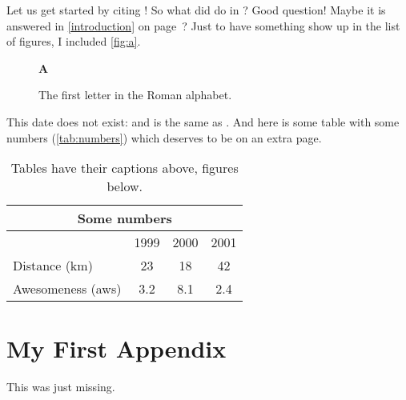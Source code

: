 \documentclass[german,bachelor]{swsLeipzig}
\begin{document}
Let us get started by citing \citet{manning:1999}!
So what did \citeauthor{manning:1999} do in \citeyear{manning:1999}?
Good question!
Maybe it is answered in \autoref{introduction} on page~\pageref{introduction}?
Just to have something show up in the list of figures, I included \autoref{fig:a}.
\begin{figure}[bt]%
  \begin{center}{\huge\bf A}\end{center}
  \caption{The first letter in the Roman alphabet.}\label{fig:a}
\end{figure}
This date does not exist: 
and is the same as .
And here is some table with some numbers (\autoref{tab:numbers})
which deserves to be on an extra page.
\begin{table}[p]%
  \caption{Tables have their captions above, figures below.}
  \begin{center}
    \begin{tabular}{lccc}\toprule
      \multicolumn{4}{c}{Some numbers}\\\midrule
      & 1999 & 2000 & 2001 \\\cmidrule(l){2-4}
      Distance (km) & 23 & 18 & 42 \\
      Awesomeness (aws) & 3.2 & 8.1 & 2.4 \\\bottomrule
    \end{tabular}
  \end{center}\label{tab:numbers}%
\end{table}

\appendix
\chapter{My First Appendix}
This was just missing.

\end{document}

